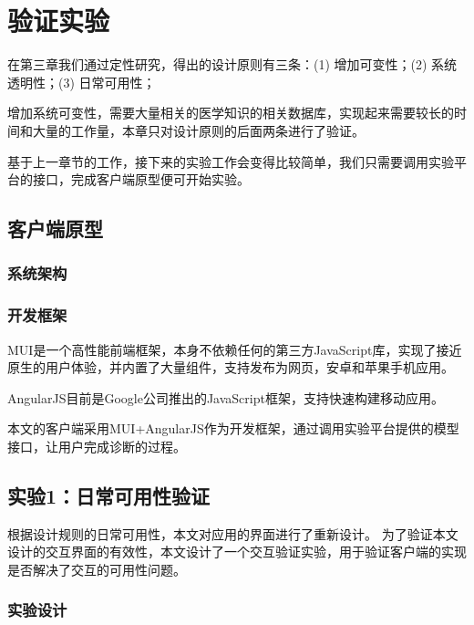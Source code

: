 \chapter{验证实验}

在第三章我们通过定性研究，得出的设计原则有三条：(1) 增加可变性；(2) 系统透明性；(3) 日常可用性；

增加系统可变性，需要大量相关的医学知识的相关数据库，实现起来需要较长的时间和大量的工作量，本章只对设计原则的后面两条进行了验证。

基于上一章节的工作，接下来的实验工作会变得比较简单，我们只需要调用实验平台的接口，完成客户端原型便可开始实验。


\section{客户端原型}

\subsection{系统架构}


\subsection{开发框架}
MUI是一个高性能前端框架，本身不依赖任何的第三方JavaScript库，实现了接近原生的用户体验，并内置了大量组件，支持发布为网页，安卓和苹果手机应用。

AngularJS目前是Google公司推出的JavaScript框架，支持快速构建移动应用。

本文的客户端采用MUI+AngularJS作为开发框架，通过调用实验平台提供的模型接口，让用户完成诊断的过程。


\section{实验1：日常可用性验证}

根据设计规则的日常可用性，本文对应用的界面进行了重新设计。
为了验证本文设计的交互界面的有效性，本文设计了一个交互验证实验，用于验证客户端的实现是否解决了交互的可用性问题。

\subsection{实验设计}


